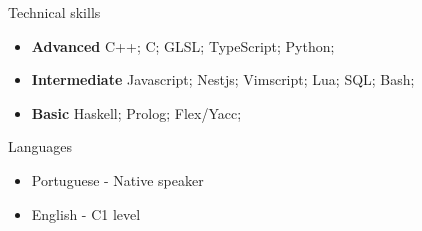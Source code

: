 \documentclass[]{mcdowellcv}
\begin{document}
	\begin{cvsection}{Technical skills}
		\begin{cvsubsection}{}{}{}
			\begin{itemize}
				\item \textbf{Advanced} C++; C; GLSL; TypeScript; Python;
				\item \textbf{Intermediate} Javascript; Nestjs; Vimscript; Lua; SQL; Bash;
				\item \textbf{Basic} Haskell; Prolog; Flex/Yacc;
			\end{itemize}
		\end{cvsubsection}
	\end{cvsection}

	\begin{cvsection}{Languages}
		\begin{cvsubsection}{}{}{}
			\begin{itemize}
				\item Portuguese - Native speaker
				\item English - C1 level
			\end{itemize}
		\end{cvsubsection}
	\end{cvsection}
\end{document}
